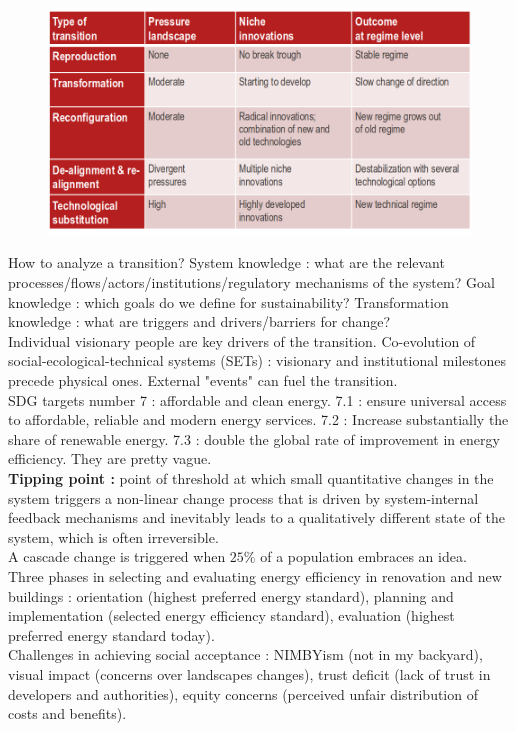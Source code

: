 \documentclass[../main.tex]{subfiles}
\begin{document}
\begin{figure}[hbt!]
    \centering
    \includegraphics[width=0.5\linewidth]{IMAGES/NRJ_supply/Screenshot from 2025-04-16 08-41-48.png}
\end{figure}

How to analyze a transition? System knowledge : what are the relevant processes/flows/actors/institutions/regulatory mechanisms of the system? Goal knowledge : which goals do we define for sustainability? Transformation knowledge : what are triggers and drivers/barriers for change?\\

Individual visionary people are key drivers of the transition. Co-evolution of social-ecological-technical systems (SETs) : visionary and institutional milestones precede physical ones. External "events" can fuel the transition.\\

SDG targets number 7 : affordable and clean energy. 7.1 : ensure universal access to affordable, reliable and modern energy services. 7.2 : Increase substantially the share of renewable energy. 7.3 : double the global rate of improvement in energy efficiency. They are pretty vague.\\

\textbf{Tipping point :} point of threshold at which small quantitative changes in the system triggers a non-linear change process that is driven by system-internal feedback mechanisms and inevitably leads to a qualitatively different state of the system, which is often irreversible.\\
A cascade change is triggered when $25\%$ of a population embraces an idea. \\
Three phases in selecting and evaluating energy efficiency in renovation and new buildings : orientation (highest preferred energy standard), planning and implementation (selected energy efficiency standard), evaluation (highest preferred energy standard today).\\


Challenges in achieving social acceptance : NIMBYism (not in my backyard), visual impact (concerns over landscapes changes), trust deficit (lack of trust in developers and authorities), equity concerns (perceived unfair distribution of costs and benefits).\\
\end{document}
